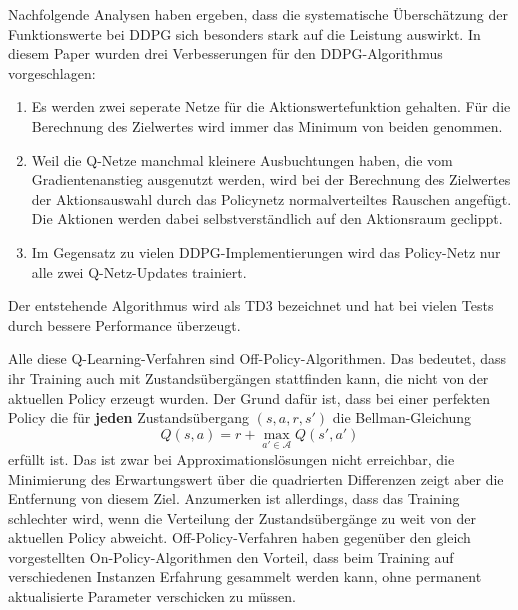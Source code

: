 Nachfolgende Analysen haben ergeben, dass die systematische Überschätzung der Funktionswerte bei DDPG sich besonders stark auf die Leistung auswirkt. \cite{DBLP:journals/corr/abs-1802-09477}
In diesem Paper wurden drei Verbesserungen für den DDPG-Algorithmus vorgeschlagen:
\begin{enumerate}
	\item Es werden zwei seperate Netze für die Aktionswertefunktion gehalten.
	Für die Berechnung des Zielwertes wird immer das Minimum von beiden genommen.
	\item Weil die Q-Netze manchmal kleinere Ausbuchtungen haben, die vom Gradientenanstieg ausgenutzt werden, wird bei der Berechnung des Zielwertes der Aktionsauswahl durch das Policynetz normalverteiltes Rauschen angefügt.
	Die Aktionen werden dabei selbstverständlich auf den Aktionsraum geclippt.
	\item Im Gegensatz zu vielen DDPG-Implementierungen wird das Policy-Netz nur alle zwei Q-Netz-Updates trainiert.
\end{enumerate}
Der entstehende Algorithmus wird als TD3 bezeichnet und hat bei vielen Tests durch bessere Performance überzeugt.

Alle diese Q-Learning-Verfahren sind Off-Policy-Algorithmen.
Das bedeutet, dass ihr Training auch mit Zustandsübergängen stattfinden kann, die nicht von der aktuellen Policy erzeugt wurden.
Der Grund dafür ist, dass bei einer perfekten Policy die für \textbf{jeden} Zustandsübergang $(s, a, r, s')$ die Bellman-Gleichung
\begin{equation}
	Q(s, a) = r + \max_{a' \in \mathcal{A}}{Q(s', a')}
\end{equation}
erfüllt ist.
Das ist zwar bei Approximationslösungen nicht erreichbar, die Minimierung des Erwartungswert über die quadrierten Differenzen zeigt aber die Entfernung von diesem Ziel.
Anzumerken ist allerdings, dass das Training schlechter wird, wenn die Verteilung der Zustandsübergänge zu weit von der aktuellen Policy abweicht.
Off-Policy-Verfahren haben gegenüber den gleich vorgestellten On-Policy-Algorithmen den Vorteil, dass beim Training auf verschiedenen Instanzen Erfahrung gesammelt werden kann, ohne permanent aktualisierte Parameter verschicken zu müssen.


